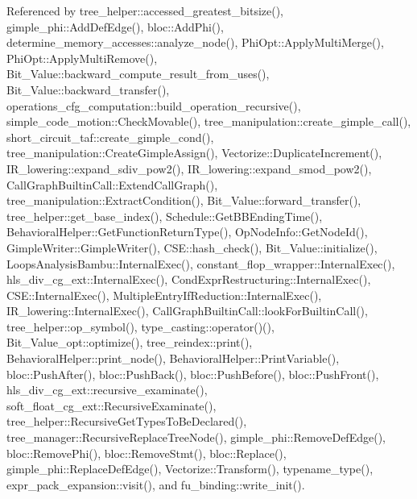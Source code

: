 Referenced by tree\+\_\+helper\+::accessed\+\_\+greatest\+\_\+bitsize(), gimple\+\_\+phi\+::\+Add\+Def\+Edge(), bloc\+::\+Add\+Phi(), determine\+\_\+memory\+\_\+accesses\+::analyze\+\_\+node(), Phi\+Opt\+::\+Apply\+Multi\+Merge(), Phi\+Opt\+::\+Apply\+Multi\+Remove(), Bit\+\_\+\+Value\+::backward\+\_\+compute\+\_\+result\+\_\+from\+\_\+uses(), Bit\+\_\+\+Value\+::backward\+\_\+transfer(), operations\+\_\+cfg\+\_\+computation\+::build\+\_\+operation\+\_\+recursive(), simple\+\_\+code\+\_\+motion\+::\+Check\+Movable(), tree\+\_\+manipulation\+::create\+\_\+gimple\+\_\+call(), short\+\_\+circuit\+\_\+taf\+::create\+\_\+gimple\+\_\+cond(), tree\+\_\+manipulation\+::\+Create\+Gimple\+Assign(), Vectorize\+::\+Duplicate\+Increment(), I\+R\+\_\+lowering\+::expand\+\_\+sdiv\+\_\+pow2(), I\+R\+\_\+lowering\+::expand\+\_\+smod\+\_\+pow2(), Call\+Graph\+Builtin\+Call\+::\+Extend\+Call\+Graph(), tree\+\_\+manipulation\+::\+Extract\+Condition(), Bit\+\_\+\+Value\+::forward\+\_\+transfer(), tree\+\_\+helper\+::get\+\_\+base\+\_\+index(), Schedule\+::\+Get\+B\+B\+Ending\+Time(), Behavioral\+Helper\+::\+Get\+Function\+Return\+Type(), Op\+Node\+Info\+::\+Get\+Node\+Id(), Gimple\+Writer\+::\+Gimple\+Writer(), C\+S\+E\+::hash\+\_\+check(), Bit\+\_\+\+Value\+::initialize(), Loops\+Analysis\+Bambu\+::\+Internal\+Exec(), constant\+\_\+flop\+\_\+wrapper\+::\+Internal\+Exec(), hls\+\_\+div\+\_\+cg\+\_\+ext\+::\+Internal\+Exec(), Cond\+Expr\+Restructuring\+::\+Internal\+Exec(), C\+S\+E\+::\+Internal\+Exec(), Multiple\+Entry\+If\+Reduction\+::\+Internal\+Exec(), I\+R\+\_\+lowering\+::\+Internal\+Exec(), Call\+Graph\+Builtin\+Call\+::look\+For\+Builtin\+Call(), tree\+\_\+helper\+::op\+\_\+symbol(), type\+\_\+casting\+::operator()(), Bit\+\_\+\+Value\+\_\+opt\+::optimize(), tree\+\_\+reindex\+::print(), Behavioral\+Helper\+::print\+\_\+node(), Behavioral\+Helper\+::\+Print\+Variable(), bloc\+::\+Push\+After(), bloc\+::\+Push\+Back(), bloc\+::\+Push\+Before(), bloc\+::\+Push\+Front(), hls\+\_\+div\+\_\+cg\+\_\+ext\+::recursive\+\_\+examinate(), soft\+\_\+float\+\_\+cg\+\_\+ext\+::\+Recursive\+Examinate(), tree\+\_\+helper\+::\+Recursive\+Get\+Types\+To\+Be\+Declared(), tree\+\_\+manager\+::\+Recursive\+Replace\+Tree\+Node(), gimple\+\_\+phi\+::\+Remove\+Def\+Edge(), bloc\+::\+Remove\+Phi(), bloc\+::\+Remove\+Stmt(), bloc\+::\+Replace(), gimple\+\_\+phi\+::\+Replace\+Def\+Edge(), Vectorize\+::\+Transform(), typename\+\_\+type(), expr\+\_\+pack\+\_\+expansion\+::visit(), and fu\+\_\+binding\+::write\+\_\+init().

\mbox{\label{classtree__node_a4acb8eaa2d77287880caa24020d639fe}} 
